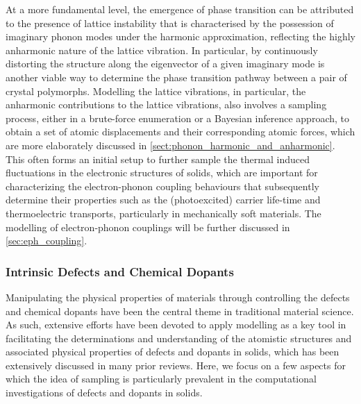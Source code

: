 At a more fundamental level, the emergence of phase transition can be attributed to the presence of lattice instability that is characterised by the possession of imaginary phonon modes under the harmonic approximation,\cite{pallikara2022physical} reflecting the highly anharmonic nature of the lattice vibration. In particular, by continuously distorting the structure along the eigenvector of a given imaginary mode is another viable way to determine the phase transition pathway between a pair of crystal polymorphs.\cite{rahim2020polymorph,pallikara2021phase} Modelling the lattice vibrations, in particular, the anharmonic contributions to the lattice vibrations, also involves a sampling process, either in a brute-force enumeration or a Bayesian inference approach, to obtain a set of atomic displacements and their corresponding atomic forces, which are more elaborately discussed in \cref{sect:phonon_harmonic_and_anharmonic}. This often forms an initial setup to further sample the thermal induced fluctuations in the electronic structures of solids, which are important for characterizing the electron-phonon coupling behaviours that subsequently determine their properties such as the (photoexcited) carrier life-time and thermoelectric transports, particularly in mechanically soft materials.\cite{li2018spin,li2019anharmonicity,yang2020correlating,yang2022mapping,fratini2017map}  The modelling of electron-phonon couplings will be further discussed in \cref{sec:eph_coupling}.

\subsubsection{Intrinsic Defects and Chemical Dopants} Manipulating the physical properties of materials through controlling the defects and chemical dopants have been the central theme in traditional material science. As such, extensive efforts have been devoted to apply modelling as a key tool in facilitating the determinations and understanding of the atomistic structures and associated physical properties of defects and dopants in solids, which has been extensively discussed in many prior reviews.\cite{freysoldt2014first,anand2022convergent} Here, we focus on a few aspects for which the idea of sampling is particularly prevalent in the computational investigations of defects and dopants in solids.

